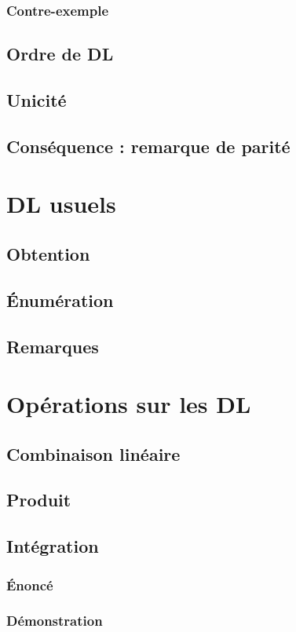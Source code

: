 \documentclass[12pt,a4paper,french]{book}
\begin{document}
			\subsubsection{Contre-exemple}
		\subsection{Ordre de DL}
		\subsection{Unicité}
		\subsection{Conséquence : remarque de parité}
	\section{DL usuels}
		\subsection{Obtention}
		\subsection{Énumération}
		\subsection{Remarques}
	\section{Opérations sur les DL}
		\subsection{Combinaison linéaire}
		\subsection{Produit}
		\subsection{Intégration}
			\subsubsection{Énoncé}
			\subsubsection{Démonstration}
\end{document}
